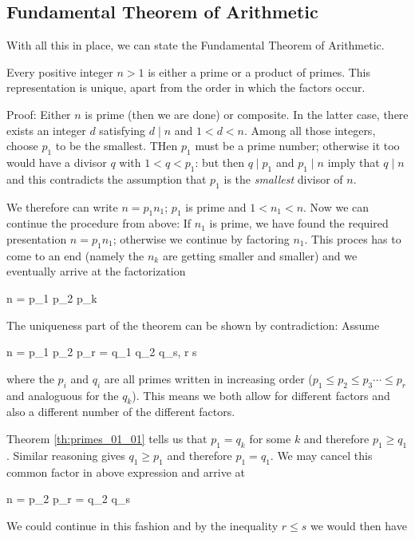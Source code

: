 \subsection{Fundamental Theorem of Arithmetic}

With all this in place, we can state the Fundamental Theorem of Arithmetic.

\begin{theorem}
    Every positive integer $n > 1$ is either a prime or a product of primes. This representation is unique, apart from the order in which the factors occur.
\end{theorem}

Proof: Either $n$ is prime (then we are done) or composite. In the latter case, there exists an integer $d$ satisfying $d \mid n$ and $1 < d < n$. Among all those integers, choose $p_1$ to be the smallest. THen $p_1$ must be a prime number; otherwise it too would have a divisor $q$ with $1 < q < p_1$: but then $q \mid p_1$ and $p_1 \mid n$ imply that $q \mid n$ and this contradicts the assumption that $p_1$ is the \emph{smallest} divisor of $n$.

We therefore can write $n = p_1 n_1$; $p_1$ is prime and $1 < n_1 < n$. Now we can continue the procedure from above: If $n_1$ is prime, we have found the required presentation $n = p_1 n_1$; otherwise we continue by factoring $n_1$. This proces has to come to an end (namely the $n_k$ are getting smaller and smaller) and we eventually arrive at the factorization

\bee
n = p_1 p_2 \cdots p_k
\eee

The uniqueness part of the theorem can be shown by contradiction: Assume

\bee
n = p_1 p_2 \cdots p_r = q_1 q_2 \cdots q_s, \quad r \leq s
\eee

where the $p_i$ and $q_i$ are all primes written in increasing order ($p_1 \leq p_2 \leq p_3 \cdots \leq p_r$ and analoguous for the $q_k$). This means we both allow for different factors and also a different number of the different factors.

Theorem \ref{th:primes_01_01} tells us that $p_1 = q_k$ for some $k$ and therefore $p_1 \geq q_1$. Similar reasoning gives $q_1 \geq p_1$ and therefore $p_1 = q_1$. We may cancel this common factor in above expression and arrive at

\bee
n = p_2 \cdots p_r = q_2 \cdots q_s
\eee

We could continue in this fashion and by the inequality $r \leq s$ we would then have


